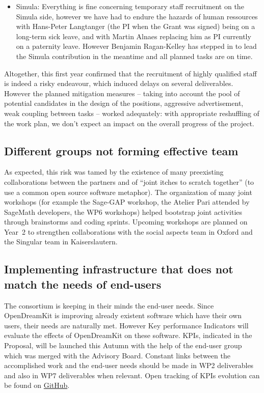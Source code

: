 \documentclass{deliverablereport}
\begin{document}
\begin{itemize}
\item{Simula:} Everything is fine concerning temporary staff
  recruitment on the Simula side, however we have had to endure the
  hazards of human ressources with Hans-Peter Langtanger (the PI when
  the Grant was signed) being on a long-term sick leave, and with
  Martin Alnaes replacing him as PI currently on a paternity
  leave. However Benjamin Ragan-Kelley has stepped in to lead the
  Simula contribution in the meantime and all planned tasks are on time.\\
\end{itemize}


Altogether, this first year confirmed that the recruitment of highly
qualified staff is indeed a risky endeavour, which induced delays on
several deliverables. However the planned mitigation measures --
taking into account the pool of potential candidates in the design of
the positions, aggressive advertisement, weak coupling between tasks
-- worked adequately: with appropriate reshuffling of the work plan,
we don't expect an impact on the overall progress of the project.

\subsection{Different groups not forming effective team}

As expected, this risk was tamed by the existence of many preexisting
collaborations between the partners and of ``joint itches to scratch
together'' (to use a common open source software metaphor). The
organization of many joint workshops (for example the Sage-GAP
workshop, the Atelier Pari attended by SageMath developers, the WP6
workshops) helped bootstrap joint activities through brainstorms and
coding sprints. Upcoming workshops are planned on Year~2 to strengthen
collaborations with the social aspects team in Oxford and the Singular
team in Kaiserslautern.


\subsection{Implementing infrastructure that does not match the needs of end-users}

The consortium is keeping in their minds the end-user needs. Since
OpenDreamKit is improving already existent software which have their
own users, their needs are naturally met. However Key performance
Indicators will evaluate the effects of OpenDreamKit on these
software. KPIs, indicated in the Proposal, will be launched this
Autumn with the help of the end-user group which was merged with the
Advisory Board. Constant links between the accomplished work and the
end-user needs should be made in WP2 deliverables and also in WP7
deliverables when relevant.  Open tracking of KPIs evolution can be
found on
\href{https://github.com/OpenDreamKit/OpenDreamKit/labels/KPI}{GitHub}.
\end{document}
